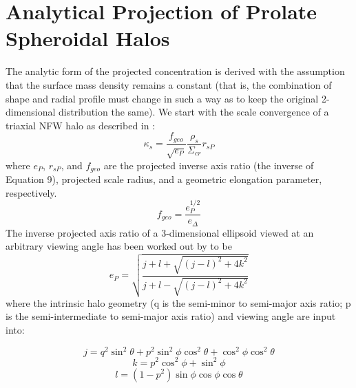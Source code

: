 \chapter{Analytical Projection of Prolate Spheroidal Halos}

The analytic form of the projected concentration is derived with the
assumption that the surface mass density remains a constant (that is, the
combination of shape and radial profile must change in such a way as to
keep the original 2-dimensional distribution the same). We start with
the scale convergence of a triaxial NFW halo as described in
\citet{SerenoEtAl2010a}:
\begin{equation}
\kappa_{s} = \frac{f_{geo}}{\sqrt{e_{P}}} \frac{\rho_{s}}{\Sigma_{cr}} r_{sP}
\end{equation}
where $e_{P}$, $r_{sP}$, and $f_{geo}$  are the projected inverse axis
ratio (the inverse of Equation 9), projected scale radius, and a
geometric elongation parameter, respectively. 
\begin{equation}
f_{geo} = \frac{e_{P}^{1/2}}{e_{\Delta}}
\end{equation}
The inverse projected axis ratio of a 3-dimensional ellipsoid viewed
at an arbitrary viewing angle has been worked out by
\citet{Binggeli1980} to be
\begin{equation}
e_{P} = \sqrt{\frac{j+l+\sqrt{(j-l)^{2}+4k^{2}}}{j+l-\sqrt{(j-l)^{2}+4k^{2}}}}
\end{equation}
where the intrinsic halo geometry (q is the semi-minor to semi-major
axis ratio; p is the semi-intermediate to semi-major axis ratio) and
viewing angle are input into: 

\begin{equation}
j = q^{2} \sin^{2}\theta + p^{2}\sin^{2}\phi \cos^{2} \theta + \cos^{2}\phi \cos^{2}\theta
\end{equation}
\[ k = p^{2} \cos^{2}\phi +\sin^{2}\phi \]
\[ l = \left(1-p^{2} \right) \sin\phi \cos\phi \cos\theta \]

